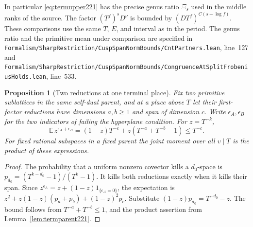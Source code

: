 \documentclass[a4paper,11pt]{article}
\newtheorem{proposition}{Proposition}[section]
\theoremstyle{definition}
\theoremstyle{remark}
\newcommand{\srcloc}[2]{{\small\nolinkurl{#1.lean}}, line~#2}
\numberwithin{equation}{section}
\begin{document}
In particular \eqref{eq:termupper221} has the precise genus
ratio \(\Xi_s\) used in the middle ranks of the source. The
factor \((T^f)^sD^\nu\) is bounded by
\((D T^f)^{C(s+\log f)}\). These comparisons use the same
\(T\), \(E\), and interval as in the period. The genus ratio
and the primitive mean under comparison are specified in
\srcloc{Formalism/SharpRestriction/CuspSpanNormBounds/CntPartners}{127}
and
\srcloc{Formalism/SharpRestriction/CuspSpanNormBounds/CongruenceAtSplitFrobeniusHolds}{533}.

\begin{proposition}[Two reductions at one terminal place]
\label{prop:joint221}
Fix two primitive sublattices in the same self-dual parent,
and at a place above \(T\) let their first-factor reductions
have dimensions \(a,b\ge1\) and span of dimension \(c\).
Write \(\epsilon_A,\epsilon_B\) for the two indicators of
failing the hyperplane condition. For \(z=T^{-k}\),
\[
 \mathbb E\,z^{\epsilon_A+\epsilon_B}
   =(1-z)T^{-c}+z(T^{-a}+T^{-b}-1)\le T^{-c}.
\]
For fixed rational subspaces in a fixed parent the joint
moment over all \(v\mid T\) is the product of these expressions.
\end{proposition}
\begin{proof}
The probability that a uniform nonzero covector kills a
\(d_0\)-space is \(p_{d_0}=(T^{k-d_0}-1)/(T^k-1)\).
It kills both reductions exactly when it kills their span.
Since \(z^{\epsilon_A}=z+(1-z)1_{\{\epsilon_A=0\}}\), the
expectation is \(z^2+z(1-z)(p_a+p_b)+(1-z)^2p_c\).
Substitute \((1-z)p_{d_0}=T^{-d_0}-z\). The bound follows
from \(T^{-a}+T^{-b}\le1\), and the product assertion from
Lemma~\ref{lem:termparent221}.
\end{proof}
\end{document}
